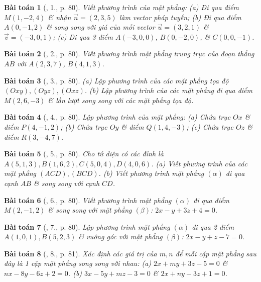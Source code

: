 \documentclass{article}
\newtheorem{baitoan}{Bài toán}
\begin{document}
\begin{baitoan}[\cite{SGK_Toan_12_hinh_hoc_co_ban}, 1., p. 80]
	Viết phương trình của mặt phẳng: (a) Đi qua điểm $M(1,-2,4)$ \& nhận $\vec{n} = (2,3,5)$ làm vector pháp tuyến; (b) Đi qua điểm $A(0,-1,2)$ \& song song với giá của mỗi vector $\vec{u} = (3,2,1)$ \& $\vec{v} = (-3,0,1)$; (c) Đi qua 3 điểm $A(-3,0,0)$, $B(0,-2,0)$, \& $C(0,0,-1)$.
\end{baitoan}

\begin{baitoan}[\cite{SGK_Toan_12_hinh_hoc_co_ban}, 2., p. 80]
	Viết phương trình mặt phẳng trung trực của đoạn thẳng $AB$ với $A(2,3,7)$, $B(4,1,3)$.
\end{baitoan}

\begin{baitoan}[\cite{SGK_Toan_12_hinh_hoc_co_ban}, 3., p. 80]
	(a) Lập phương trình của các mặt phẳng tọa độ $(Oxy),(Oyz),(Oxz)$. (b) Lập phương trình của các mặt phẳng đi qua điểm $M(2,6,-3)$ \& lần lượt song song với các mặt phẳng tọa độ.
\end{baitoan}

\begin{baitoan}[\cite{SGK_Toan_12_hinh_hoc_co_ban}, 4., p. 80]
	Lập phương trình của mặt phẳng: (a) Chứa trục $Ox$ \& điểm $P(4,-1,2)$; (b) Chứa trục $Oy$ \& điểm $Q(1,4,-3)$; (c) Chứa trục $Oz$ \& điểm $R(3,-4,7)$.
\end{baitoan}

\begin{baitoan}[\cite{SGK_Toan_12_hinh_hoc_co_ban}, 5., p. 80]
	Cho tứ diện có các đỉnh là $A(5,1,3),B(1,6,2),C(5,0,4),D(4,0,6)$. (a) Viết phương trình của các mặt phẳng $(ACD),(BCD)$. (b) Viết phương trình mặt phẳng $(\alpha)$ đi qua cạnh $AB$ \& song song với cạnh $CD$.
\end{baitoan}

\begin{baitoan}[\cite{SGK_Toan_12_hinh_hoc_co_ban}, 6., p. 80]
	Viết phương trình mặt phẳng $(\alpha)$ đi qua điểm $M(2,-1,2)$ \& song song với mặt phẳng $(\beta)$: $2x - y + 3z + 4 = 0$.
\end{baitoan}

\begin{baitoan}[\cite{SGK_Toan_12_hinh_hoc_co_ban}, 7., p. 80]
	Lập phương trình mặt phẳng $(\alpha)$ đi qua 2 điểm $A(1,0,1),B(5,2,3)$ \& vuông góc với mặt phẳng $(\beta)$: $2x - y + z - 7 = 0$.
\end{baitoan}

\begin{baitoan}[\cite{SGK_Toan_12_hinh_hoc_co_ban}, 8., p. 81]
	Xác định các giá trị của $m,n$ để mỗi cặp mặt phẳng sau đây là 1 cặp mặt phẳng song song với nhau: (a) $2x + my + 3z - 5 = 0$ \& $nx - 8y - 6z + 2 = 0$. (b) $3x - 5y + mz - 3 = 0$ \& $2x + ny - 3z + 1 = 0$.
\end{baitoan}
\end{document}
